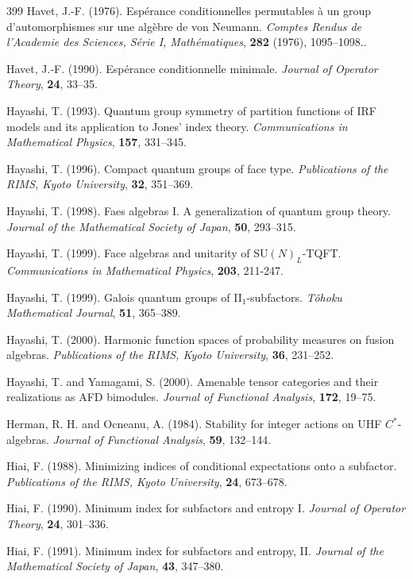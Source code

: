 \documentclass[12pt]{article}
\theoremstyle{plain}
\theoremstyle{definition}
\numberwithin{equation}{section}
\begin{document}
\begin{thebibliography} {399}
Havet, J.-F. (1976).
Esp\'erance conditionnelles permutables \`a un group
d'automorphismes sur une alg\`ebre de von Neumann.
{\em Comptes Rendus de l'Academie des Sciences, S\'erie I, Math\'ematiques},
{\bf 282}  (1976),  1095--1098..

Havet, J.-F. (1990).
Esp\'erance conditionnelle minimale.
{\em Journal of Operator Theory}, {\bf 24}, 33--35.

Hayashi, T. (1993).
Quantum group symmetry of partition functions of
IRF models and its application to Jones' index theory.
{\em Communications in Mathematical Physics}, {\bf 157}, 331--345.

Hayashi, T. (1996).
Compact quantum groups of face type.
{\em Publications of the RIMS, Kyoto University},
{\bf 32}, 351--369.

Hayashi, T. (1998).
Faes algebras I. A generalization of quantum group theory.
{\em Journal of the Mathematical Society of Japan}, 
{\bf 50}, 293--315.

Hayashi, T. (1999).
Face algebras and unitarity of SU$(N)_L$-TQFT.
{\em Communications in Mathematical Physics},
{\bf 203}, 211-247.

Hayashi, T. (1999).
Galois quantum groups of II$_1$-subfactors.
{\em T\^ohoku Mathematical Journal},
{\bf 51}, 365--389.

Hayashi, T. (2000).
Harmonic function spaces of probability measures on fusion
algebras.
{\em Publications of the RIMS, Kyoto University},
{\bf 36}, 231--252.

Hayashi, T. and Yamagami, S. (2000).
Amenable tensor categories and their realizations
as AFD bimodules.
{\em Journal of Functional Analysis}, {\bf 172}, 19--75.

Herman, R. H. and Ocneanu, A. (1984).
Stability for integer actions on UHF $C^*$-algebras.
{\em Journal of Functional Analysis},
{\bf 59}, 132--144.

Hiai, F. (1988).
Minimizing indices of conditional expectations onto a subfactor. 
{\em Publications of the RIMS, Kyoto University}, {\bf 24}, 673--678.

Hiai, F. (1990).
Minimum index for subfactors and entropy I.
{\em Journal of Operator Theory}, {\bf 24}, 301--336.

Hiai, F. (1991).
Minimum index for subfactors and entropy, II.
{\em Journal of the Mathematical Society of Japan}, 
{\bf 43}, 347--380.


\end{thebibliography}
\end{document}
